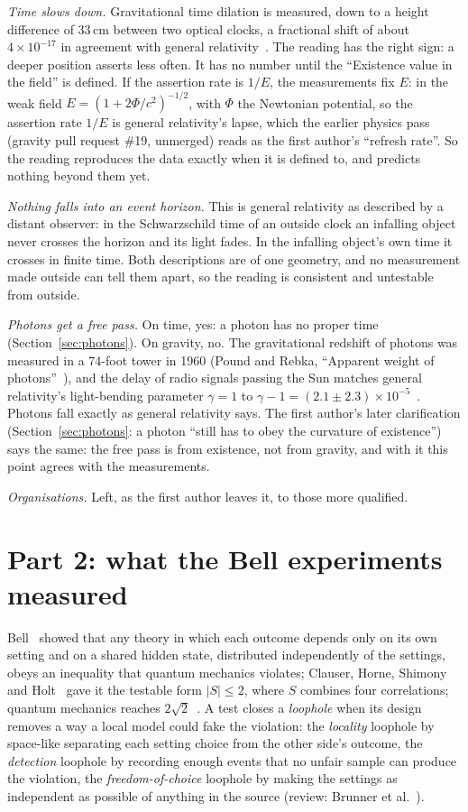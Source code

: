 \documentclass[11pt,a4paper]{article}
\theoremstyle{definition}
\theoremstyle{remark}
\begin{document}
\noindent\emph{Time slows down.} Gravitational time dilation is measured, down to a height difference of 33\,cm between two optical
clocks, a fractional shift of about $4\times10^{-17}$ in agreement with general relativity~\cite{chou}. The reading has the right sign: a
deeper position asserts less often. It has no number until the ``Existence value in the field'' is defined. If the assertion rate is
$1/E$, the measurements fix $E$: in the weak field $E=(1+2\Phi/c^2)^{-1/2}$, with $\Phi$ the Newtonian potential, so the assertion
rate $1/E$ is general relativity's lapse, which the earlier physics pass (gravity pull request \#19, unmerged) reads as the first
author's ``refresh rate''. So the reading reproduces the data exactly when it is defined to, and predicts nothing beyond them yet.

\noindent\emph{Nothing falls into an event horizon.} This is general relativity as described by a distant observer: in the Schwarzschild
time of an outside clock an infalling object never crosses the horizon and its light fades. In the infalling object's own time it
crosses in finite time. Both descriptions are of one geometry, and no measurement made outside can tell them apart, so the reading is
consistent and untestable from outside.

\noindent\emph{Photons get a free pass.} On time, yes: a photon has no proper time (Section~\ref{sec:photons}). On gravity, no. The
gravitational redshift of photons was measured in a 74-foot tower in 1960 (Pound and Rebka, ``Apparent weight of photons''~\cite{pr60}),
and the delay of radio signals passing the Sun matches general relativity's light-bending parameter $\gamma=1$ to
$\gamma-1=(2.1\pm2.3)\times10^{-5}$~\cite{cassini}. Photons fall exactly as general relativity says. The first author's later
clarification (Section~\ref{sec:photons}: a photon ``still has to obey the curvature of existence'') says the same: the free pass is from
existence, not from gravity, and with it this point agrees with the measurements.

\noindent\emph{Organisations.} Left, as the first author leaves it, to those more qualified.

\section{Part 2: what the Bell experiments measured}\label{sec:measured}

Bell~\cite{bell} showed that any theory in which each outcome depends only on its own setting and on a shared hidden state, distributed
independently of the settings, obeys an inequality that quantum mechanics violates; Clauser, Horne, Shimony and Holt~\cite{chsh} gave it
the testable form $|S|\le 2$, where $S$ combines four correlations; quantum mechanics reaches $2\sqrt2$~\cite{cirelson}. A test closes a
\emph{loophole} when its design removes a way a local model could fake the violation: the \emph{locality} loophole by space-like separating
each setting choice from the other side's outcome, the \emph{detection} loophole by recording enough events that no unfair sample can
produce the violation, the \emph{freedom-of-choice} loophole by making the settings as independent as possible of anything in the source
(review: Brunner et al.~\cite{brunner}).
\end{document}
